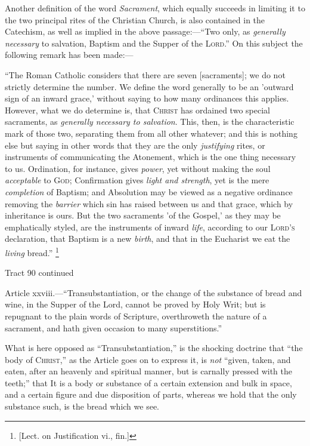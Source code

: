 Another definition of the word \emph{Sacrament}, which equally
succeeds in limiting it to the two principal rites of the Christian
Church, is also contained in the Catechism, as well as implied in the
above passage:—``Two only, as \emph{generally necessary} to
salvation, Baptism and the Supper of the L\textsc{ord}.''
On this subject the following remark has been made:—

``The Roman Catholic considers that there are seven
[sacraments]; we do not strictly determine the number. We define the
word generally to be an 'outward sign of an inward grace,' without
saying to how many ordinances this applies. However, what we do
determine is, that C\textsc{hrist} has ordained two
special sacraments, as \emph{generally necessary to salvation}. This,
then, is the characteristic mark of those two, separating them from
all other whatever; and this is nothing else but saying in other words
that they are the only \emph{justifying} rites, or instruments of
communicating the Atonement, which is the one thing necessary to
us. Ordination, for instance, gives \emph{power}, yet without making
the soul \emph{acceptable} to G\textsc{od}; Confirmation
gives \emph{light and strength}, yet is the mere \emph{completion} of
Baptism; and Absolution may be viewed as a negative ordinance removing
the \emph{barrier} which sin has raised between us and that grace,
which by inheritance is ours. But the two sacraments 'of the Gospel,'
as they may be emphatically styled, are the instruments of inward \emph{life},
according to our L\textsc{ord's} declaration, that
Baptism is a new \emph{birth}, and that in the Eucharist we eat the \emph{living}
bread.'' \footnote{[Lect. on Justification vi., fin.]}

Tract 90 continued


Article xxviii.—``Transubstantiation, or the change of
the substance of bread and wine, in the Supper of the Lord, cannot be
proved by Holy Writ; but is repugnant to the plain words of Scripture,
overthroweth the nature of a sacrament, and hath given occasion to
many superstitions.''

What is here opposed as ``Transubstantiation,'' is the
shocking doctrine that ``the body of C\textsc{hrist},''
as the Article goes on to express it, is \emph{not} ``given,
taken, and eaten, after an heavenly and spiritual manner, but is
carnally pressed with the teeth;'' that It is a body or substance
of a certain extension and bulk in space, and a certain figure and due
disposition of parts, whereas we hold that the only substance such, is
the bread which we see.


